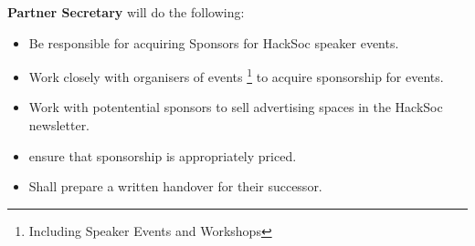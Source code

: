 \item \textbf{Partner Secretary} will do the following:
\begin{itemize}
	\item Be responsible for acquiring Sponsors for HackSoc speaker events.
	\item Work closely with organisers of events \footnote{Including Speaker Events and Workshops} to acquire sponsorship for events.
	\item Work with potentential sponsors to sell advertising spaces in the HackSoc newsletter.
	\item ensure that sponsorship is appropriately priced.
	\item Shall prepare a written handover for their successor.
\end{itemize}
